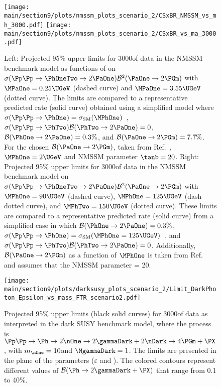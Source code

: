 \begin{figure}
\texttt{[image: \\main/section9/plots/nmssm\_plots\_scenario\_2/CSxBR\_NMSSM\_vs\_mh\_3000.pdf]}
\texttt{[image: \\main/section9/plots/nmssm\_plots\_scenario\_2/CSxBR\_vs\_ma\_3000.pdf]}
\caption{Left: Projected 95\% \CL upper limits for 3000\fbinv of data in the NMSSM benchmark model as functions of \MPhOneTwo on ${\sigma(\Pp\Pp \to \PhOneTwo \to 2 \PaOne) \mathcal{B}^2(\PaOne \to 2 \PGm)}$ with $\MPaOne=0.25\UGeV$ (dashed curve)
and $\MPaOne=3.55\UGeV$ (dotted curve).
The limits are compared to a representative predicted rate (solid curve) obtained using a simplified model where
$\sigma (\Pp\Pp \to \PhOne)=\sigma_\mathrm{SM}(\MPhOne)$~\cite{Dittmaier:2011ti},
${\sigma (\Pp\Pp \to \PhTwo) \mathcal{B}(\PhTwo \to 2 \PaOne) = 0}$, $\mathcal{B}(\PhOne \to 2 \PaOne) = 0.3\%$,
and $\mathcal{B}(\PaOne \to 2\PGm) = 7.7\%$. For the chosen $\mathcal{B}(\PaOne \to 2\PGm)$, taken from Ref.~\cite{Dermisek:2010mg}, $\MPhOne = 2\UGeV$ and NMSSM parameter $\tanb = 20$. Right: Projected 95\% \CL upper limits for 3000\fbinv of data in the NMSSM benchmark model on $\sigma(\Pp\Pp \to \PhOneTwo \to 2 \PaOne) \mathcal{B}^2(\PaOne \to 2 \PGm)$ with $\MPhOne=90\UGeV$ (dashed curve),
$\MPhOne=125\UGeV$ (dash-dotted curve), and $\MPhTwo=150\UGeV$ (dotted curve). These limits are compared to a representative predicted rate (solid curve) from a simplified case in which $\mathcal{B}(\PhOne \to 2 \PaOne) = 0.3\%$,
$\sigma (\Pp\Pp \to \PhOne)=\sigma_\mathrm{SM}(\MPhOne = 125\UGeV)$~\cite{Dittmaier:2011ti}, and
$\sigma (\Pp\Pp \to \PhTwo)  \mathcal{B}(\PhTwo \to 2 \PaOne) = 0$. Additionally, $\mathcal{B}(\PaOne \to 2\PGm)$
as a function of $\MPhOne$ is taken from Ref.~\cite{Dermisek:2010mg} and assumes that the NMSSM parameter \tanb = 20.}
\label{fig:my_label2}
\end{figure}

\begin{figure}
\centering
\texttt{[image: \\main/section9/plots/darksusy\_plots\_scenario\_2/Limit\_DarkPhoton\_Epsilon\_vs\_mass\_FTR\_scenario2.pdf]}
\caption{Projected 95\% \CL upper limits (black solid curves) for 3000\fbinv of data as interpreted in the dark SUSY benchmark model, where the process is $\Pp\Pp \to \Ph \to 2\nOne \to 2\gammaDark+2\nDark \to  4\PGm+\PX$, with $m_{\nOne}=10$\UGeV and $\MgammaDark=1$\UGeV.
The limits are presented in the plane of the parameters ($\varepsilon$ and \MgammaDark). The colored contours represent different values of $\mathcal{B}(\Ph \to 2\gammaDark + \PX)$ that range from 0.1 to 40\%. }
\label{fig:my_label4}
\end{figure}


